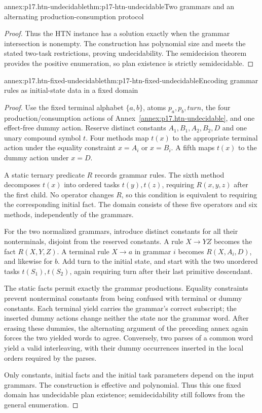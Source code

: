 \begin{annexitem}{annex:p17.htn-undecidable}{thm:p17-htn-undecidable}{Two grammars and an alternating production-consumption protocol}
\begin{proof}
Thus the HTN instance has a solution exactly when the grammar intersection
is nonempty. The construction has polynomial size and meets the stated
two-task restrictions, proving undecidability. The semidecision theorem
provides the positive enumeration, so plan existence is strictly semidecidable.
\end{proof}
\end{annexitem}

\begin{annexitem}{annex:p17.htn-fixed-undecidable}{thm:p17-htn-fixed-undecidable}{Encoding grammar rules as initial-state data in a fixed domain}
\begin{proof}
Use the fixed terminal alphabet \(\{a,b\}\), atoms \(p_a,p_b,\mathit{turn}\),
the four production/consumption actions of
Annex~\ref{annex:p17.htn-undecidable}, and one effect-free dummy action.
Reserve distinct constants \(A_1,B_1,A_2,B_2,D\) and one unary compound
symbol \(t\). Four methods map \(t(x)\) to the appropriate terminal action
under the equality constraint \(x=A_i\) or \(x=B_i\). A fifth maps
\(t(x)\) to the dummy action under \(x=D\).

A static ternary predicate \(R\) records grammar rules. The sixth method
decomposes \(t(x)\) into ordered tasks \(t(y),t(z)\), requiring
\(R(x,y,z)\) after the first child. No operator changes \(R\), so this
condition is equivalent to requiring the corresponding initial fact. The
domain consists of these five operators and six methods, independently of
the grammars.

For the two normalized grammars, introduce distinct constants for all their
nonterminals, disjoint from the reserved constants. A rule \(X\to YZ\)
becomes the fact \(R(X,Y,Z)\). A terminal rule \(X\to a\) in grammar
\(i\) becomes \(R(X,A_i,D)\), and likewise for \(b\). Add turn to the
initial state, and start with the two unordered tasks \(t(S_1),t(S_2)\),
again requiring turn after their last primitive descendant.

The static facts permit exactly the grammar productions. Equality constraints
prevent nonterminal constants from being confused with terminal or dummy
constants. Each terminal yield carries the grammar's correct subscript;
the inserted dummy actions change neither the state nor the grammar word.
After erasing these dummies, the alternating argument of the preceding annex
again forces the two yielded words to agree. Conversely, two parses of a
common word yield a valid interleaving, with their dummy occurrences inserted
in the local orders required by the parses.

Only constants, initial facts and the initial task parameters depend on the
input grammars. The construction is effective and polynomial. Thus this one
fixed domain has undecidable plan existence; semidecidability still follows
from the general enumeration.
\end{proof}
\end{annexitem}

